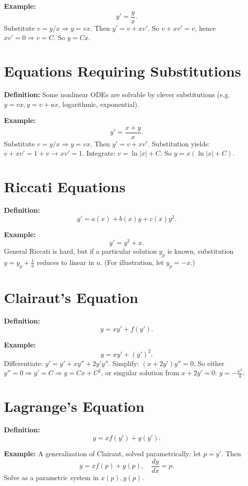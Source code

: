 \documentclass[12pt]{book}
\begin{document}
\textbf{Example:}
\[
y' = \frac{y}{x}.
\]
Substitute \(v = y/x \Rightarrow y = vx\). Then \(y' = v + x v'\). So
\(v + x v' = v\), hence \(xv' = 0 \Rightarrow v=C\).  
So \(y = Cx\).

\chapter{Equations Requiring Substitutions}
\textbf{Definition:} Some nonlinear ODEs are solvable by clever substitutions (e.g. \(y = vx, y=v+ax\), logarithmic, exponential).

\textbf{Example:}
\[
y' = \frac{x+y}{x}.
\]
Substitute \(v = y/x \Rightarrow y = vx\). Then
\(y' = v + x v'\). Substitution yields:  
\(v + xv' = 1+v\) → \(x v' = 1\).  
Integrate: \(v = \ln|x| + C\).  
So \(y = x(\ln|x| + C).\)

\chapter{Riccati Equations}
\textbf{Definition:}
\[
y' = a(x) + b(x)y + c(x)y^2.
\]

\textbf{Example:}
\[
y' = y^2 + x.
\]
General Riccati is hard, but if a particular solution \(y_p\) is known, substitution \(y = y_p + \tfrac{1}{u}\) reduces to linear in \(u\).  
(For illustration, let \(y_p = -x\).)

\chapter{Clairaut’s Equation}
\textbf{Definition:}
\[
y = x y' + f(y').
\]

\textbf{Example:}
\[
y = x y' + (y')^2.
\]
Differentiate: \(y' = y' + x y'' + 2y'y''\). Simplify:
\((x + 2y')y'' = 0\).  
So either \(y''=0 \Rightarrow y' = C \Rightarrow y = Cx + C^2\),  
or singular solution from \(x+2y' = 0\): \(y = -\tfrac{x^2}{4}.\)

\chapter{Lagrange’s Equation}
\textbf{Definition:}
\[
y = x f(y') + g(y').
\]

\textbf{Example:}
A generalization of Clairaut, solved parametrically: let \(p = y'\). Then
\[
y = x f(p) + g(p), \quad \frac{dy}{dx} = p.
\]
Solve as a parametric system in \(x(p), y(p)\).
\end{document}
